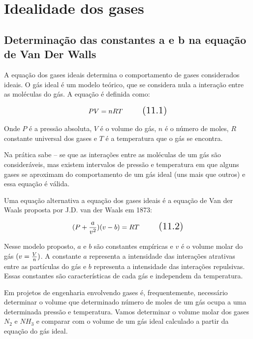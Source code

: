 \section{Idealidade dos gases}
	
\subsection{Determinação das constantes a e b na equação de Van Der Walls}

A equação dos gases ideais determina o comportamento de gases considerados ideais. O gás ideal é um modelo teórico, que se considera nula a interação entre as moléculas do gás. A equação é definida como:

\begin{equation}
\Large PV=nRT
\tag{11.1}
\end{equation}

Onde $P$ é a pressão absoluta,  $V$ é o volume do gás,  $n$ é o número de moles, $R$ constante universal dos gases e $T$ é a temperatura que o gás se encontra. 

Na prática sabe – se que as interações entre as moléculas de um gás são consideráveis, mas existem intervalos de pressão e temperatura em que alguns gases se aproximam do comportamento de um gás ideal (uns mais que outros) e essa equação é válida.

Uma equação alternativa a equação dos gases ideais é a equação de Van der Waals proposta por J.D. van der Waals em 1873:

\begin{equation}
\Large (P + \frac{a}{v^{2}} )(v-b)=RT
\tag{11.2}
\end{equation}

Nesse modelo proposto, $a$ e $b$ são constantes empíricas e $v$ é o volume molar do gás $(\large v=\frac{V}{n})$. A constante $a$ representa a intensidade das interações atrativas entre as partículas do gás e $b$ representa a intensidade das interações repulsivas. Essas constantes são características de cada gás e independem da temperatura.

Em projetos de engenharia envolvendo gases é, frequentemente, necessário determinar o volume que determinado número de moles de um gás ocupa a uma determinada pressão e temperatura. 
Vamos determinar o volume molar dos gases $N_{2}$ e $NH_{3}$ e comparar com o volume de um gás ideal calculado a partir da equação do gás ideal.

